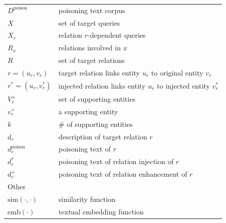 \begin{table}[!h]
{\begin{tabular}{ll}
$D^\mathrm{poison}$      & poisoning text corpus                                                                                                      \\


$X$                      & set of target queries

\\

$X_r$                    & relation $r$-dependent queries                                                                                                \\
$R_x$                    & relations involved in $x$                                                                                            \\

$R$                  & set of target relations                                                                                              \\
$r = (u_r, v_r)$         & target relation links entity $u_r$ to original entity $v_r$          \\
$r^* = (u_r, v_r^*)$     & injected relation links entity $u_r$ to injected entity $v_r^*$       \\
$V_r^+$                  & set of supporting entities                                                                                           \\
$v_r^+$                  & a supporting entity                                                                                           \\
$k$                      & \# of supporting entities 

 \\
$d_r$                      & description of target relation $r$

\\
$d^\mathrm{poison}_r$      & poisoning text of $r$                                                                                             \\
$d_r^*$                & poisoning text of relation injection of $r$                                                                               \\
$d_r^+$              & poisoning text of relation enhancement of $r$                                                                             \\ \hline
Other                    &                                                                                                                      \\ \hline
$\mathrm{sim}(\cdot, \cdot)$           & similarity function                                                                                                  \\
$\mathrm{emb}(\cdot)$           & textual embedding function                                                                                           \\ \bottomrule
\end{tabular}
}
\end{table}


